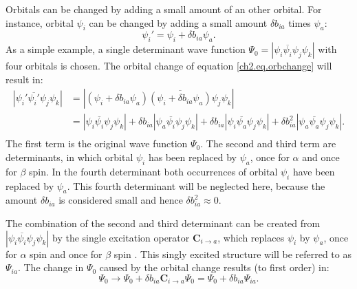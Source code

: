 Orbitals can be changed by adding a small amount of an other orbital. For instance, orbital $\psi_i$ can be changed by adding a small amount $\delta b_{ia}$ times $\psi_a$:
\begin{equation}
\psi_i' = \psi_i + \delta b_{ia} \psi_a.
\label{ch2.eq.orbchange}
\end{equation}
As a simple example, a single determinant wave function $\Psi_0=|\psi_i\overline{\psi_i}\psi_j\psi_k|$ with four orbitals is chosen. The orbital change of equation \ref{ch2.eq.orbchange} will result in:
\begin{equation}    
\begin{split}
|\psi_i'\overline{\psi_i'}\psi_j\psi_k | & = |(\psi_i + \delta b_{ia} \psi_a)\overline{(\psi_i + \delta b_{ia}\psi_a)}\psi_j\psi_k |\\
& = |\psi_i\overline{\psi_i}\psi_j\psi_k| + \delta b_{ia}|\psi_a\overline{\psi_i}\psi_j\psi_k| + \delta b_{ia} |\psi_i\overline{\psi_a}\psi_j\psi_k| + \delta b^2_{ia} |\psi_a\overline{\psi_a}\psi_j\psi_k|.\\
\end{split}
\label{ch2.eq.detchange}
\end{equation}
The first term is the original wave function $\Psi_0$. The second and third term are determinants, in which orbital $\psi_i$ has been replaced by $\psi_a$, once for $\alpha$ and once for $\beta$ spin. In the fourth determinant both occurrences of orbital $\psi_i$ have been replaced by $\psi_a$. This fourth determinant will be neglected here, because the amount $\delta b_{ia}$ is considered small and hence $\delta b_{ia}^2 \approx 0$.

The combination of the second and third determinant can be created from $|\psi_i\overline{\psi_i}\psi_j\psi_k |$ by the single excitation operator $\mathbf{C}_{i \rightarrow a}$, which replaces $\psi_i$ by $\psi_a$, once for $\alpha$ spin and once for $\beta$ spin \cite{ruttink}. This singly excited structure will be referred to as $\Psi_{ia}$. The change in $\Psi_0$ caused by the orbital change results (to first order) in:
\begin{equation}
\Psi_{0} \rightarrow \Psi_{0} + \delta b_{ia} \mathbf{C}_{i \rightarrow a} \Psi_{0} = \Psi_{0} + \delta b_{ia} \Psi_{ia}.
\label{ch2.eq.wfchange}
\end{equation}

